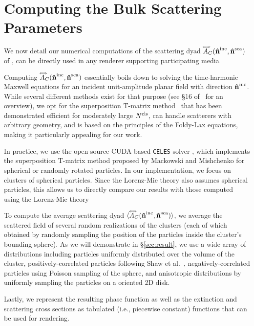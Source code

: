 \section{Computing the Bulk Scattering Parameters}
\label{sec:ours_numerical}
%
We now detail our numerical computations of the scattering dyad $\accentset{\Longleftrightarrow}{A}_C(\mathbf{\hat{n}}^{\text{inc}},\mathbf{\hat{n}}^{\text{sca}})$ of , can be directly used in any renderer supporting participating media~\cite{novak2018monte} 

Computing $\accentset{\Longleftrightarrow}{A}_C(\mathbf{\hat{n}}^{\text{inc}},\mathbf{\hat{n}}^{\text{sca}})$ essentially boils down to solving the time-harmonic Maxwell equations for an incident unit-amplitude planar field with direction $\mathbf{\hat{n}}^{\text{inc}}$. While several different methods exist for that purpose (see \S 16 of~\cite{mishchenko2014electromagnetic} for an overview), we opt for the superposition T-matrix method~\cite{mackowski1996calculation} that has been demonstrated efficient for moderately large ${N^\text{cls}}$, can handle scatterers with arbitrary geometry, and is based on the principles of the Foldy-Lax equations, making it particularly appealing for our work. 

In practice, we use the open-source CUDA-based \texttt{CELES} solver \cite{egel2017celes}, which implements the superposition T-matrix method proposed by Mackowski and Mishchenko  for spherical or randomly rotated particles.
In our implementation, we focus on clusters of spherical particles.
Since the Lorenz-Mie theory also assumes spherical particles, this allows us to directly compare our results with those computed using the Lorenz-Mie theory 

To compute the average scattering dyad ${\langle \accentset{\Longleftrightarrow}{A}_C(\mathbf{\hat{n}}^{\text{inc}},\mathbf{\hat{n}}^{\text{sca}}) \rangle}$, we average the scattered field of several random realizations of the clusters (each of which obtained by randomly sampling the position of the particles inside the cluster's bounding sphere).
As we will demonstrate in \S\ref{sec:result}, we use a wide array of distributions including particles uniformly distributed over the volume of the cluster, positively-correlated particles following Shaw et al.~, negatively-correlated particles using Poisson sampling of the sphere, and anisotropic distributions by uniformly sampling the particles on a oriented 2D disk.

Lastly, we represent the resulting phase function as well as the extinction and scattering cross sections as tabulated (i.e., piecewise constant) functions that can be used for rendering.


